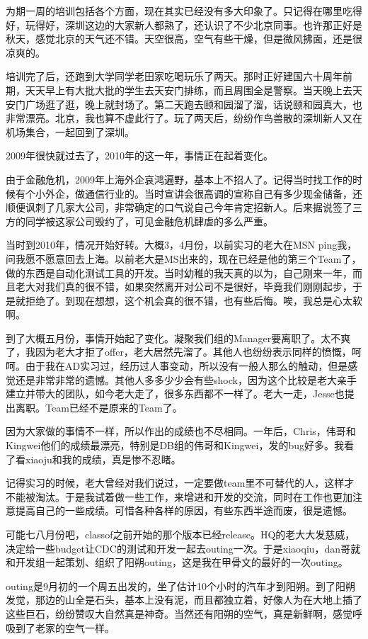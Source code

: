为期一周的培训包括各个方面，现在其实已经没有多大印象了。只记得在哪里吃得好，玩得好，深圳这边的大家新人都熟了，还认识了不少北京同事。也许那正好是秋天，感觉北京的天气还不错。天空很高，空气有些干燥，但是微风拂面，还是很凉爽的。

培训完了后，还跑到大学同学老田家吃喝玩乐了两天。那时正好建国六十周年前期，天天早上有大批大批的学生去天安门排练，而且周围全是警察。当天晚上去天安门广场逛了逛，晚上就封场了。第二天跑去颐和园溜了溜，话说颐和园真大，也非常漂亮。北京，我也算不虚此行了。玩了两天后，纷纷作鸟兽散的深圳新人又在机场集合，一起回到了深圳。

2009年很快就过去了，2010年的这一年，事情正在起着变化。

由于金融危机，2009年上海外企哀鸿遍野，基本上不招人了。记得当时找工作的时候有个小外企，做通信行业的。当时宣讲会很高调的宣称自己有多少现金储备，还顺便讽刺了几家大公司，非常确定的口气说自己今年肯定招新人。后来据说签了三方的同学被这家公司毁约了，可见金融危机肆虐的多么严重。

当时到2010年，情况开始好转。大概3，4月份，以前实习的老大在MSN ping我，问我愿不愿意回去上海。以前老大是MS出来的，现在已经是他的第三个Team了，做的东西是自动化测试工具的开发。当时幼稚的我天真的以为，自己刚来一年，而且老大对我们真的很不错，如果突然离开对公司不是很好，毕竟我们刚刚起步，于是就拒绝了。到现在想想，这个机会真的很不错，也有些后悔。唉，我总是心太软啊。

到了大概五月份，事情开始起了变化。凝聚我们组的Manager要离职了。太不爽了，我因为老大才拒了offer，老大居然先溜了。其他人也纷纷表示同样的愤慨，呵呵。由于我在AD实习过，经历过人事变动，所以没有一般人那么的触动，但是感觉还是非常非常的遗憾。其他人多多少少会有些shock，因为这个比较是老大亲手建立并带大的团队，如今老大走了，很多东西都不一样了。老大一走，Jesse也提出离职。Team已经不是原来的Team了。

因为大家做的事情不一样，所以作出的成绩也不尽相同。一年后，Chris，伟哥和Kingwei他们的成绩最漂亮，特别是DB组的伟哥和Kingwei，发的bug好多。我看了看xiaoju和我的成绩，真是惨不忍睹。

记得实习的时候，老大曾经对我们说过，一定要做team里不可替代的人，这样才不能被淘汰。于是我试着做一些工作，来增进和开发的交流，同时在工作也更加注意提高自己的一些成绩。可惜各种各样的原因，有些东西半途而废，很是遗憾。

可能七八月份吧，classof之前开始的那个版本已经release。HQ的老大大发慈威，决定给一些budget让CDC的测试和开发一起去outing一次。于是xiaoqiu，dan哥就和开发组一起策划、组织了阳朔outing，这是我在甲骨文的最好的一次outing。

outing是9月初的一个周五出发的，坐了估计10个小时的汽车才到阳朔。到了阳朔发觉，那边的山全是石头，基本上没有泥，而且都独立着，好像人为在大地上插了这些巨石，纷纷赞叹大自然真是神奇。当然还有阳朔的空气，真是新鲜啊，感觉呼吸到了老家的空气一样。

